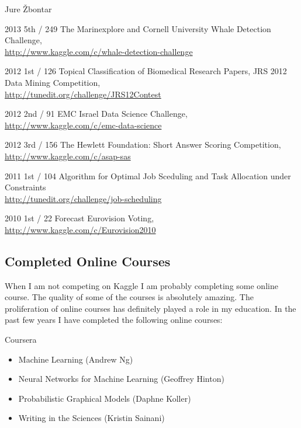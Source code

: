 \documentclass[12pt,a4paper]{article}
\begin{document}
\begin{cv}{Jure \v{Z}bontar}
\begin{cvlist}{}
\item[2013 \quad 5th / 249] The Marinexplore and Cornell University Whale Detection Challenge, \\
\url{http://www.kaggle.com/c/whale-detection-challenge}
\item[2012 \quad 1st / 126] Topical Classification of Biomedical Research Papers, 
JRS 2012 Data Mining Competition, \\
\url{http://tunedit.org/challenge/JRS12Contest}
\item[2012 \quad 2nd / 91] EMC Israel Data Science Challenge, \\
\url{http://www.kaggle.com/c/emc-data-science}
\item[2012 \quad 3rd / 156] The Hewlett Foundation: Short Answer Scoring Competition, \\
\url{http://www.kaggle.com/c/asap-sas}
\item[2011 \quad 1st / 104] Algorithm for Optimal Job Sceduling and Task Allocation under Constraints \\
\url{http://tunedit.org/challenge/job-scheduling}
\item[2010 \quad 1st / 22] Forecast Eurovision Voting, \\
\url{http://www.kaggle.com/c/Eurovision2010}
\end{cvlist}

\subsection*{Completed Online Courses}
When I am not competing on Kaggle I am probably completing some online course.
The quality of some of the courses is absolutely amazing. The proliferation of
online courses has definitely played a role in my education. In the past few
years I have completed the following online courses:

\begin{cvlist}{}
\item[Coursera] 
\begin{itemize}
\item Machine Learning (Andrew Ng)
\item Neural Networks for Machine Learning (Geoffrey Hinton)
\item Probabilistic Graphical Models (Daphne Koller)
\item Writing in the Sciences (Kristin Sainani)
\end{itemize}


\end{cvlist}
\end{cv}
\end{document}
